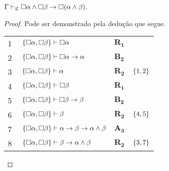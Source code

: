 \vspace{\baselineskip}
\begin{tcolorbox}[enhanced jigsaw, breakable, sharp corners, colframe=black, colback=white, boxrule=0.5pt, left=1.5mm, right=1.5mm, top=1.5mm, bottom=1.5mm]
    \begin{lemma}\label{necessity.conjunction.undistribution}
        $\Gamma\mathrel{\vdash}_\mathfrak{L}\Box\alpha\wedge\Box\beta\to\Box(\alpha\wedge\beta)$.
        \begin{proof}
        Pode ser demonstrado pela dedução que segue.

        \vspace{0.5\baselineskip}
        \footnotesize
        \setlength{\rowskip}{0.5\baselineskip}
        \begin{xltabular}{\textwidth}{r | X l l}
            \scriptsize{\phantom{0}1}\phantom{ } & $\ \set{\nec\alpha,\nec\beta}\vdash\nec\alpha$                         & $\hyperref[modal.rule.1]{\mathbf{R_1}}$        & \\[\rowskip]
            \scriptsize{\phantom{0}2}\phantom{ } & $\ \set{\nec\alpha,\nec\beta}\vdash\nec\alpha\to\alpha$                & $\hyperref[modal.axiom.modal.2]{\mathbf{B_2}}$ & \\[\rowskip]
            \scriptsize{\phantom{0}3}\phantom{ } & $\ \set{\nec\alpha,\nec\beta}\vdash\alpha$                             & $\hyperref[modal.rule.2]{\mathbf{R_2}}$        & $\left\{1,2\right\}$\\[\rowskip]
            \scriptsize{\phantom{0}4}\phantom{ } & $\ \set{\nec\alpha,\nec\beta}\vdash\nec\beta$                          & $\hyperref[modal.rule.1]{\mathbf{R_1}}$        & \\[\rowskip]
            \scriptsize{\phantom{0}5}\phantom{ } & $\ \set{\nec\alpha,\nec\beta}\vdash\nec\beta\to\beta$                  & $\hyperref[modal.axiom.modal.2]{\mathbf{B_2}}$ & \\[\rowskip]
            \scriptsize{\phantom{0}6}\phantom{ } & $\ \set{\nec\alpha,\nec\beta}\vdash\beta$                              & $\hyperref[modal.rule.2]{\mathbf{R_2}}$        & $\left\{4,5\right\}$\\[\rowskip]
            \scriptsize{\phantom{0}7}\phantom{ } & $\ \set{\nec\alpha,\nec\beta}\vdash\alpha\to\beta\to\alpha\wedge\beta$ & $\hyperref[modal.axiom.3]{\mathbf{A_3}}$       & \\[\rowskip]
            \scriptsize{\phantom{0}8}\phantom{ } & $\ \set{\nec\alpha,\nec\beta}\vdash\beta\to\alpha\wedge\beta$          & $\hyperref[modal.rule.2]{\mathbf{R_2}}$        & $\left\{3,7\right\}$\\[\rowskip]

\end{xltabular}
\end{proof}
\end{lemma}
\end{tcolorbox}

